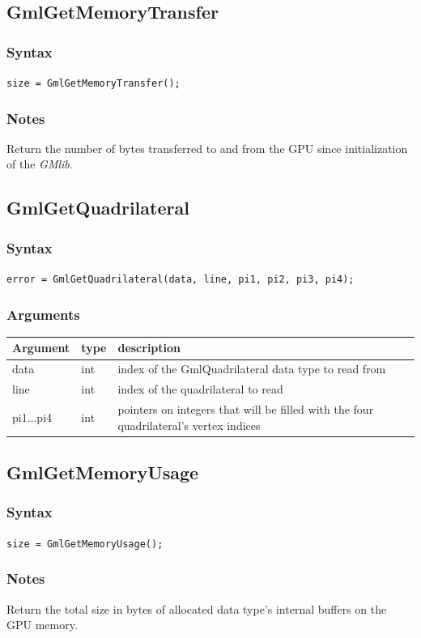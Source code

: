 \documentclass[a4paper,12pt]{article}
\begin{document}
\subsection{GmlGetMemoryTransfer}
\subsubsection*{Syntax}
{\tt size = GmlGetMemoryTransfer();}
\subsubsection*{Notes}
Return the number of bytes transferred to and from the GPU since initialization of the \emph{GMlib}.


\subsection{GmlGetQuadrilateral}
\subsubsection*{Syntax}
{\tt error = GmlGetQuadrilateral(data, line, pi1, pi2, pi3, pi4);}
\subsubsection*{Arguments}

\begin{tabular}{|m{2cm}|m{1.5cm}|m{10.5cm}|}
\hline
Argument   & type   & description \\
\hline
data       & int    & index of the GmlQuadrilateral data type to read from \\
\hline
line       & int    & index of the quadrilateral to read \\
\hline
pi1...pi4  & int    & pointers on integers that will be filled with the four quadrilateral's vertex indices \\
\hline
\end{tabular}


\subsection{GmlGetMemoryUsage}
\subsubsection*{Syntax}
{\tt size = GmlGetMemoryUsage();}
\subsubsection*{Notes}
Return the total size in bytes of allocated data type's internal buffers on the GPU memory.
\end{document}
